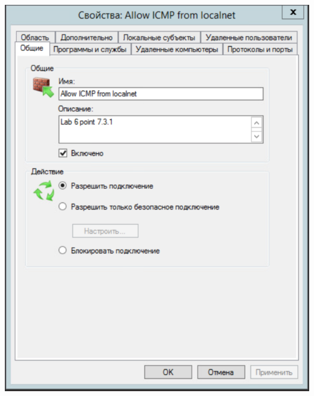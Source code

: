 \documentclass[a4paper,14pt]{extarticle}
\begin{document}
    \begin{center}
        \includegraphics[scale=0.7]{7.5.1.png}
    \end{center}
\end{document}
